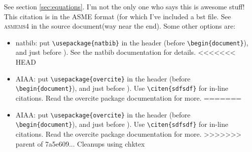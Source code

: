 \documentclass[12pt]{report}
\begin{document}
See section \ref{sec:equations}. I'm not the only one who says this is awesome stuff\cite{Mortara2004}!
This citation is in the ASME format (for which I've included a bst file. See \textsc{asmems4} in the source document(way near the end). Some  other options are:
\begin{itemize}
\item natbib:  put \verb'\usepackage{natbib}' in the header (before \verb'\begin{document}'), and \verb'' just before \verb'').  See the natbib documentation for details.
<<<<<<< HEAD
\item AIAA:  put \verb'\usepackage{overcite}' in the header (before \verb'\begin{document}'), and \verb'' just before \verb''). Use \verb'\citen{sdfsdf}' for in-line citations. Read the overcite package documentation for more.
=======
\item AIAA:  put \verb'\usepackage{overcite}' in the header (before \verb'\begin{document}'), and \verb'' just before \verb''). Use \verb'\citen{sdfsdf}' for in-line citations. Read the overcite package documentation for more. 
>>>>>>> parent of 7a5e609... Cleanups using chktex
\end{itemize}
\end{document}
